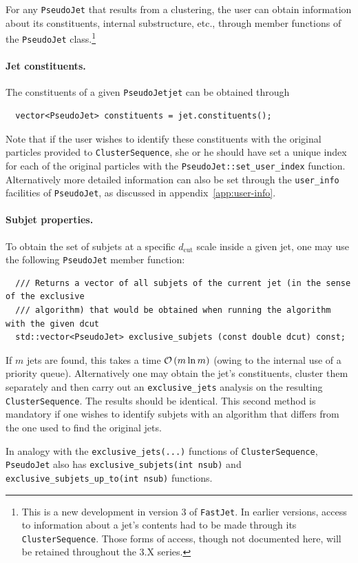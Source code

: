 \documentclass[12pt,a4]{article}
\newcommand{\fastjet}{\texttt{FastJet}\xspace}
\newcommand{\ttt}[1]{{\small\texttt{#1}}}
\newcommand{\order}[1]{{\cal O}\left(#1\right)}
\newcommand{\PseudoJet}{\ttt{PseudoJet}\xspace}
\newcommand{\PJ}{\ttt{PseudoJet}\xspace}
\newcommand{\CS}{\ttt{ClusterSequence}\xspace}
\begin{document}
For any \PseudoJet that results from a clustering, the user can
obtain information about its constituents, internal substructure,
etc., through  member functions of the \PseudoJet
class.\footnote{This is a new development in version 3 of
  \fastjet. In earlier versions, access to information about a jet's
  contents had to be made through its \CS. Those forms of access,
  though not documented here, will be retained throughout the 3.X
  series.}

\paragraph{Jet constituents.}
The constituents of a given \PseudoJet \verb|jet| can be
obtained through
\begin{lstlisting}
  vector<PseudoJet> constituents = jet.constituents();
\end{lstlisting}
%
Note that if the user wishes to identify these constituents with the
original particles provided to \ttt{ClusterSequence}, she or
he should have set a unique index for each of the original particles
with the \ttt{PseudoJet::set\_user\_index} function.
%
Alternatively more detailed information can also be set through the
\verb|user_info| facilities of \PseudoJet, as discussed in
appendix~\ref{app:user-info}.

\paragraph{Subjet properties.} To obtain the set of subjets at a specific
$d_{\mathrm{cut}}$ scale inside a given jet, one may use the following
\PseudoJet member function:
\begin{lstlisting}
  /// Returns a vector of all subjets of the current jet (in the sense of the exclusive 
  /// algorithm) that would be obtained when running the algorithm with the given dcut
  std::vector<PseudoJet> exclusive_subjets (const double dcut) const;
\end{lstlisting}
If $m$ jets are found, this takes a time $\order{m \ln m}$ (owing to
the internal use of a priority queue). Alternatively one may obtain
the jet's constituents, cluster them separately and then carry out an
\ttt{exclusive\_jets} analysis on the resulting \ttt{ClusterSequence}.
The results should be identical. This second method is mandatory if
one wishes to identify subjets with an algorithm that differs from the
one used to find the original jets.
%

In analogy with the \ttt{exclusive\_jets(...)} functions of \CS, \PJ
also has \ttt{exclusive\_subjets(int nsub)} and
\ttt{exclusive\_subjets\_up\_to(int nsub)} functions.
\end{document}
